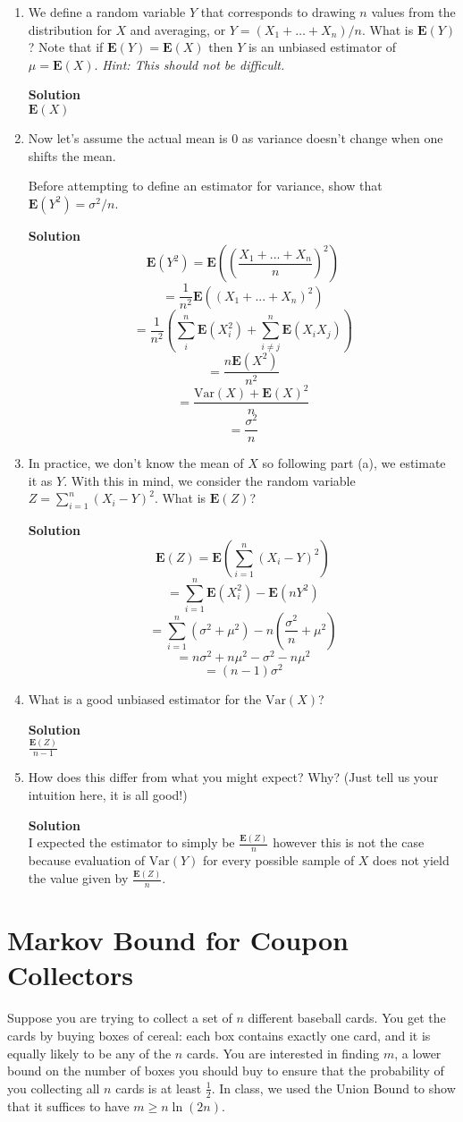 \documentclass[11pt]{article}
\newcommand*{\Question}[1]{\section{#1}}
\newenvironment{Parts}{\begin{enumerate}[label=(\alph*)]}{\end{enumerate}}
\newcommand*{\Part}{\item}
\newenvironment{Answer}{\vspace{10pt}\begin{mdframed}\textbf{Solution}\\}{\end{mdframed}\vfill\pagebreak[3]}
\newenvironment{Answer}{\vspace{10pt}}{\vfill\pagebreak[3]}
\newcommand*{\E}{\textbf{E}}
\newcommand*{\Var}[1]{\text{Var}(#1)}
\begin{document}
\begin{Parts}
  \Part We define a random variable $Y$ that corresponds to drawing $n$
    values from the distribution for $X$ and averaging, or $Y =
    (X_1 + \ldots + X_n)/n$.  What is $\E(Y)$?  Note that if
    $\E(Y) = \E(X)$ then $Y$ is an unbiased estimator of $\mu = 
    \E(X)$. {\em Hint: This should not be difficult.}
  \begin{Answer}
    $\E(X)$
  \end{Answer}

  \Part Now let's assume the actual mean is $0$ as variance doesn't
    change when one shifts the mean.

  Before attempting to define an estimator for variance, show that
  $\E(Y^2) = \sigma^2/n$.  
  \begin{Answer}
    $$\E(Y^2)=\E((\frac{X_1+...+X_n}{n})^2)$$
    $$=\frac{1}{n^2}\E((X_1+...+X_n)^2)$$
    $$=\frac{1}{n^2}(\sum_i^n \E(X_i^2)+\sum_{i\not=j}^n \E(X_iX_j))$$
    $$=\frac{n\E(X^2)}{n^2}$$
    $$=\frac{\Var{X}+\E(X)^2}{n}$$
    $$=\frac{\sigma^2}{n}$$
  \end{Answer}


  \Part In practice, we don't know the mean of $X$ so following
    part (a), we estimate it as $Y$. With this in mind, we consider the random variable $Z =
    \sum_{i=1}^n (X_i -Y)^2$.  What is $\E(Z)$?
  \begin{Answer}
    $$\E(Z)=\E(\sum_{i=1}^n(X_i-Y)^2)$$
    $$=\sum_{i=1}^n\E(X_i^2)-\E(nY^2)$$
    $$=\sum_{i=1}^n(\sigma^2+\mu^2)-n(\frac{\sigma^2}{n}+\mu^2)$$
    $$=n\sigma^2+n\mu^2-\sigma^2-n\mu^2$$
    $$=(n-1)\sigma^2$$
  \end{Answer}

  \Part What is a good unbiased estimator for the $\Var{X}$?
  \begin{Answer}
    $\frac{\E(Z)}{n-1}$
  \end{Answer}

  \Part How does this differ from what you might expect? Why?
  (Just tell us your intuition here, it is all good!)
  \begin{Answer}
    I expected the estimator to simply be $\frac{\E(Z)}{n}$ however this is not the case because evaluation of $\Var{Y}$ for every possible sample of $X$ does not yield the value given by $\frac{\E(Z)}{n}$.
  \end{Answer}
\end{Parts}


\Question{Markov Bound for Coupon Collectors} 
Suppose you are trying to collect a set of $n$ different baseball cards. You get the cards by buying boxes of cereal: each box contains exactly one card, and it is equally likely to be any of the $n$ cards. You are interested in finding $m$, a lower bound on the number of boxes you should buy to ensure that the probability of you collecting all $n$ cards is at least $\frac{1}{2}$. In class, we used the Union Bound to show that it suffices to have $m \geq n \ln (2n)$.
\end{document}
